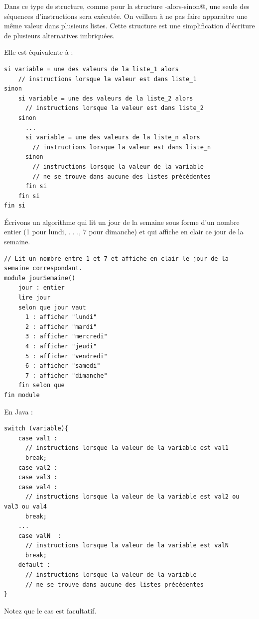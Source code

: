 \documentclass[11pt,a4paper]{article}
\begin{document}
        Dans ce type de structure, comme pour la structure \verb@si-alors-sinon@, une seule des s\'equences
        d'instructions sera ex\'ecut\'ee. On veillera \`a ne pas faire apparaitre une m\^eme valeur dans
        plusieurs listes. Cette structure est une simplification d'\'ecriture de plusieurs alternatives
        imbriqu\'ees.
      
            \par
        
        Elle est \'equivalente \`a : 
      
            \par
        \begin{verbatim}
si variable = une des valeurs de la liste_1 alors
    // instructions lorsque la valeur est dans liste_1
sinon
    si variable = une des valeurs de la liste_2 alors
      // instructions lorsque la valeur est dans liste_2
    sinon
      ...
      si variable = une des valeurs de la liste_n alors
        // instructions lorsque la valeur est dans liste_n
      sinon
        // instructions lorsque la valeur de la variable
        // ne se trouve dans aucune des listes précédentes
      fin si
    fin si
fin si
      \end{verbatim}
        \'Ecrivons un algorithme qui lit un jour de la semaine sous forme d'un nombre entier (1 pour
        lundi, . . ., 7 pour dimanche) et qui affiche en clair ce jour de la semaine.
      
            \par
        \begin{verbatim}
// Lit un nombre entre 1 et 7 et affiche en clair le jour de la semaine correspondant.
module jourSemaine()
    jour : entier
    lire jour
    selon que jour vaut
      1 : afficher "lundi"
      2 : afficher "mardi"
      3 : afficher "mercredi"
      4 : afficher "jeudi"
      5 : afficher "vendredi"
      6 : afficher "samedi"
      7 : afficher "dimanche"
    fin selon que
fin module
    \end{verbatim}En Java :
            \par
        \begin{verbatim}
switch (variable){
    case val1 :
      // instructions lorsque la valeur de la variable est val1
      break;
    case val2 :
    case val3 :
    case val4 :
      // instructions lorsque la valeur de la variable est val2 ou val3 ou val4
      break;
    ...
    case valN  :
      // instructions lorsque la valeur de la variable est valN
      break;
    default :
      // instructions lorsque la valeur de la variable
      // ne se trouve dans aucune des listes précédentes
}
      \end{verbatim}Notez que le cas \verb@default@ est facultatif.
            \par
        
\end{document}
